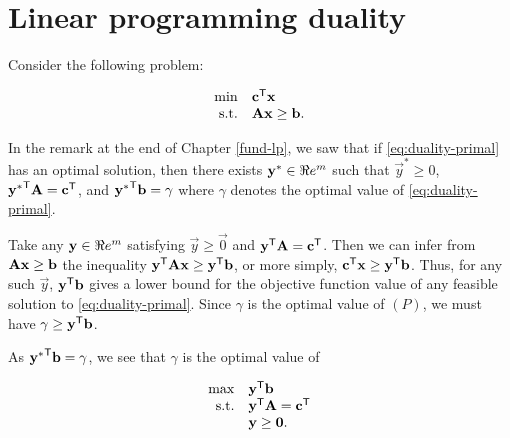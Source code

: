 %

\section{Linear programming duality}\label{linear-programming-duality}

Consider the following problem:

\begin{equation}
\begin{array}{rl}
\min & \mathbf{c}^{\mathsf{T}}\mathbf{x} \\
\mbox{s.t.} & \mathbf{A}\mathbf{x} \geq \mathbf{b}.
\label{eq:duality-primal}
\end{array}
\end{equation}

In the remark at the end of Chapter \ref{fund-lp}, we saw that if
\eqref{eq:duality-primal} has an optimal solution, then there exists
\(\mathbf{y}^*\in\Re e^m\) such that \(\vec{y}^* \geq 0\),
\({\mathbf{y}^*}^{\mathsf{T}}\mathbf{A} = \mathbf{c}^{\mathsf{T}}\), and
\({\mathbf{y}^*}^{\mathsf{T}}\mathbf{b} = \gamma\) where \(\gamma\) denotes the optimal
value of \eqref{eq:duality-primal}.

Take any \(\mathbf{y}\in\Re e^m\) satisfying \(\vec{y} \geq \vec{0}\) and
\(\mathbf{y}^{\mathsf{T}}\mathbf{A} = \mathbf{c}^{\mathsf{T}}\). Then we can infer from
\(\mathbf{A}\mathbf{x}\geq \mathbf{b}\) the inequality
\(\mathbf{y}^{\mathsf{T}}\mathbf{A}\mathbf{x} \geq \mathbf{y}^{\mathsf{T}} \mathbf{b}\), or more simply,
\(\mathbf{c}^{\mathsf{T}}\mathbf{x} \geq \mathbf{y}^{\mathsf{T}} \mathbf{b}\). Thus, for any such
\(\vec{y}\), \(\mathbf{y}^{\mathsf{T}} \mathbf{b}\) gives a lower bound for the
objective function value of any feasible solution to
\eqref{eq:duality-primal}. Since \(\gamma\) is the optimal value of
\((P)\), we must have \(\gamma \geq \mathbf{y}^{\mathsf{T}}\mathbf{b}\).

As \({\mathbf{y}^*}^{\mathsf{T}}\mathbf{b} = \gamma\), we see that \(\gamma\) is the
optimal value of

\begin{equation}
\begin{array}{rl}
\max & \mathbf{y}^{\mathsf{T}}\mathbf{b} \\
\mbox{s.t.} & \mathbf{y}^{\mathsf{T}}\mathbf{A} = \mathbf{c}^{\mathsf{T}} \\
&\mathbf{y} \geq \mathbf{0}.
\end{array}\label{eq:duality-dual}
\end{equation}


